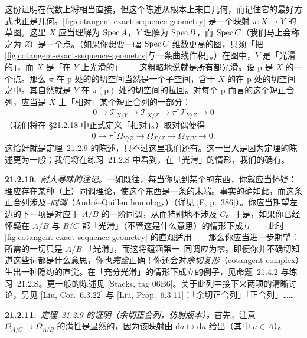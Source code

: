 这份证明在代数上将相当直接，但这个陈述从根本上来自几何，而记住它的最好方式也正是几何。\cref{fig:cotangent-exact-sequence-geometry} 是一个映射 $\pi\colon X\to Y$ 的草图。这里 $X$ 应当理解为 $\operatorname{Spec} A$，$Y$ 理解为 $\operatorname{Spec} B$，而 $\operatorname{Spec} C$（我们马上会称之为 $Z$）是一个点。（如果你想要一幅 $\operatorname{Spec} C$ 维数更高的图，只须「把\cref{fig:cotangent-exact-sequence-geometry}与一条曲线作积」。）在图中，$Y$ 是「光滑的」，而 $X$ 是「在 $Y$ 上光滑的」——这粗略地说就是所有\trFiber{}都光滑。设 $\mathrm{p}$ 是 $X$ 的一个点。那么 $\pi$ 在 $\mathrm{p}$ 处的\trFiber{}的切空间当然是一个子空间，含于 $X$ 的\trTotalSpace{}在 $\mathrm{p}$ 处的切空间之中。其\trCokernel{}自然就是 $Y$ 在 $\pi(\mathrm{p})$ 处的切空间的拉回。对每个 $\mathrm{p}$ 而言的这个短正合列，应当是 $X$ 上「相对\trTangentSheaf」某个短正合列的一部分：
\[
0\longrightarrow\mathscr{T}_{X/Y}\longrightarrow\mathscr{T}_{X/Z}\longrightarrow\pi^*\mathscr{T}_{Y/Z}\longrightarrow 0
\]
（我们将在 \S21.2.18 中正式定义「相对\trTangentSheaf」。）取对偶便得
\[
0\longrightarrow\pi^*\Omega_{Y/Z}\longrightarrow\Omega_{X/Z}\longrightarrow\Omega_{X/Y}\longrightarrow 0.
\]
这恰好就是\mbox{定理~21.2.9} 的陈述，只不过这里我们还有\trLeftExactness。这一出入是因为定理的陈述更为一般；我们将在\mbox{练习~21.2.S} 中看到，在「光滑」的情形，我们的确有\trLeftExactness。

\textbf{21.2.10.}\ \emph{耐人寻味的注记。}\quad 一如既往，每当你见到某个\trRightExact{}的东西，你就应当怀疑：理应存在某种（上）同调理论，使这个东西是一条\trLongExactSequence{}的末端。事实的确如此，而这条正合列涉及\emph{\trAndre--\trQuillen{}同调}（André--Quillen homology）（详见 [E, p.~386]）。你应当期望左边的下一项是对应于 $A/B$ 的一阶同调，从而特别地不涉及 $C$。于是，如果你已经怀疑在 $A/B$ 与 $B/C$ 都「光滑」（不管这是什么意思）的情形下\trLeftExactness{}成立——此时\cref{fig:cotangent-exact-sequence-geometry} 的直观适用——那么你应当进一步期望：所需的一切只是 $A/B$ 「光滑」，而这将蕴涵第一\trAndre--\trQuillen{}同调应为零。即便你并不确切知道这些词都是什么意思，你也\emph{完全}正确！你还会对\emph{余切复形}（cotangent complex）生出一种隐约的直觉。在「充分光滑」的情形下\trLeftExactness{}成立的例子，见\mbox{命题~21.4.2} 与\mbox{练习~21.2.S}。更一般的陈述见 [Stacks, tag 06B6]。关于此列中接下来两项的清晰讨论，另见 [Liu, Cor.~6.3.22] 与 [Liu, Prop.~6.3.11]：「余切正合列」「\trConormal{}正合列」……

\textbf{21.2.11.}\ \emph{\mbox{定理~21.2.9} 的证明（余切正合列，仿射版本）。}\quad 首先，注意 $\Omega_{A/C}\to\Omega_{A/B}$ 的满性是显然的，因为该映射由 $\mathrm{d}a\mapsto\mathrm{d}a$ 给出（其中 $a\in A$）。

